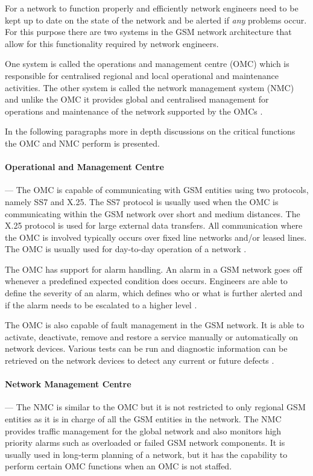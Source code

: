 For a network to function properly and efficiently network engineers need to be kept up to date on the state of the network and be alerted if \emph{any} problems occur. For this purpose there are two systems in the GSM network architecture that allow for this functionality required by network engineers. 

One system is called the operations and management centre (OMC) which is responsible for centralised regional and local operational and maintenance activities. The other system is called the network management system (NMC) and unlike the OMC it provides global and centralised management for operations and maintenance of the network supported by the OMCs \cite{GSMSysEngin}.

In the following paragraphs more in depth discussions on the critical functions the OMC and NMC perform is presented.

\paragraph{Operational and Management Centre}
--- The OMC is capable of communicating with GSM entities using two protocols, namely SS7 and X.25. The SS7 protocol is usually used when the OMC is communicating within the GSM network over short and medium distances. The X.25 protocol is used for large external data transfers. All communication where the OMC is involved typically occurs over fixed line networks and/or leased lines. The OMC is usually used for day-to-day operation of a network \cite{GSMSysEngin}.

The OMC has support for alarm handling. An alarm in a GSM network goes off whenever a predefined expected condition does occurs. Engineers are able to define the severity of an alarm, which defines who or what is further alerted and if the alarm needs to be escalated to a higher level \cite{GSMSysEngin}.

The OMC is also capable of fault management in the GSM network. It is able to activate, deactivate, remove and restore a service manually or automatically on network devices\cite{GSM92}. Various tests can be run and diagnostic information can be retrieved on the network devices to detect any current or future defects \cite{GSMSysEngin}.

\paragraph{Network Management Centre}
--- The NMC is similar to the OMC but it is not restricted to only regional GSM entities as it is in charge of all the GSM entities in the network. The NMC provides traffic management for the global network and also monitors high priority alarms such as overloaded or failed GSM network components. It is usually used in long-term planning of a network, but it has the capability to perform certain OMC functions when an OMC is not staffed. 

